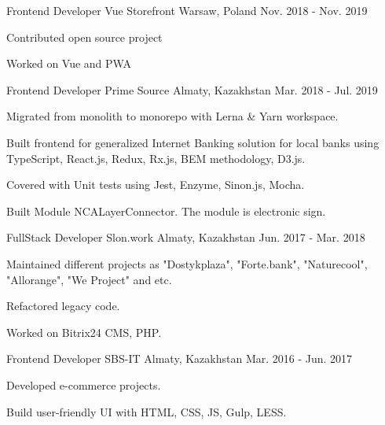 \begin{cventries}
  \cventry
    {Frontend Developer} %
    {Vue Storefront} %
    {Warsaw, Poland} %
    {Nov. 2018 - Nov. 2019} %
    {
      \begin{cvitems} %
        \item {Contributed open source project}
        \item {Worked on Vue and PWA}
      \end{cvitems}
    }

  \cventry
    {Frontend Developer} %
    {Prime Source} %
    {Almaty, Kazakhstan} %
    {Mar. 2018 - Jul. 2019} %
    {
      \begin{cvitems} %
        \item {Migrated from monolith to monorepo with Lerna & Yarn workspace.}
        \item {Built frontend for generalized Internet Banking solution for local banks using TypeScript, React.js, Redux, Rx.js, BEM methodology, D3.js.}
        \item {Covered with Unit tests using Jest, Enzyme, Sinon.js, Mocha.}
        \item {Built Module NCALayerConnector. The module is electronic sign.}
      \end{cvitems}
    }

  \cventry
    {FullStack Developer} %
    {Slon.work} %
    {Almaty, Kazakhstan} %
    {Jun. 2017 - Mar. 2018} %
    {
      \begin{cvitems} %
        \item {Maintained different projects as "Dostykplaza", "Forte.bank", "Naturecool", "Allorange", "We Project" and etc.}
        \item {Refactored legacy code.}
        \item {Worked on Bitrix24 CMS, PHP.}
      \end{cvitems}
    }

  \cventry
    {Frontend Developer} %
    {SBS-IT} %
    {Almaty, Kazakhstan} %
    {Mar. 2016 - Jun. 2017} %
    {
      \begin{cvitems} %
        \item {Developed e-commerce projects.}
        \item {Build user-friendly UI with HTML, CSS, JS, Gulp, LESS.}
      \end{cvitems}
    }


\end{cventries}
